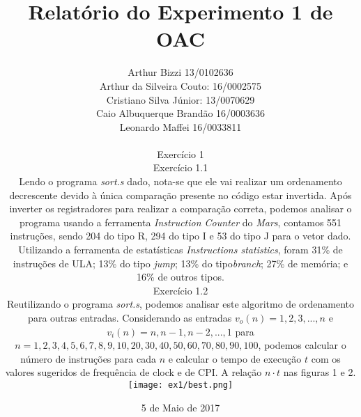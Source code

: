 \documentclass[12pt, a4paper, twoside]{article}
\begin{document}
\title{Relatório do Experimento 1 de OAC}
\author{
Arthur Bizzi 13/0102636 \\
Arthur da Silveira Couto: 16/0002575 \\
Cristiano Silva Júnior: 13/0070629 \\
Caio Albuquerque Brandão 16/0003636 \\
Leonardo Maffei 16/0033811 \\
\date{5 de Maio de 2017}
\maketitle

\section{Exercício 1}

\subsection{Exercício 1.1}

Lendo o programa \textit{sort.s} dado, nota-se que ele vai realizar um  ordenamento decrescente devido à única comparação presente no código estar  invertida. Após inverter os registradores para realizar a comparação correta, podemos analisar o programa usando a ferramenta \textit{Instruction Counter} do \textit{Mars}, contamos 551 instruções, sendo 204 do tipo R, 294 do tipo I e 53 do tipo J para o vetor dado. Utilizando a ferramenta de estatísticas \textit{Instructions statistics}, foram 31\% de instruções de ULA; 13\% do tipo \textit{jump}; 13\% do tipo\textit{branch}; 27\% de memória; e 16\% de outros tipos.

\subsection{Exercício 1.2}

Reutilizando o programa \textit{sort.s}, podemos analisar este algoritmo de ordenamento para outras entradas. Considerando as entradas $v_o(n) = {1,2,3,...,n}$ e $v_i(n)={n,n-1,n-2,...,1}$ para $n={1,2,3,4,5,6,7,8,9,10,20,30,40,50,60,70,80,90,100}$, podemos calcular o número de instruções para cada $n$ e calcular o tempo de execução $t$ com os valores sugeridos de frequência de clock e de CPI. A relação $n \cdot t$ nas figuras 1 e 2.

\begin{figure}
    \centering
    \texttt{[image: ex1/best.png]}
    \caption{Melhores casos de ordenamento}
\end{figure}


}
\end{document}
